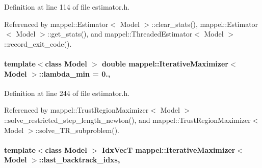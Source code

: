 Definition at line 114 of file estimator.\+h.



Referenced by mappel\+::\+Estimator$<$ Model $>$\+::clear\+\_\+stats(), mappel\+::\+Estimator$<$ Model $>$\+::get\+\_\+stats(), and mappel\+::\+Threaded\+Estimator$<$ Model $>$\+::record\+\_\+exit\+\_\+code().

\paragraph[{\texorpdfstring{lambda\+\_\+min}{lambda_min}}]{\setlength{\rightskip}{0pt plus 5cm}template$<$class Model $>$ double {\bf mappel\+::\+Iterative\+Maximizer}$<$ Model $>$\+::lambda\+\_\+min = 0.\hspace{0.3cm}{\ttfamily [protected]}, {\ttfamily [inherited]}}\hypertarget{classmappel_1_1IterativeMaximizer_a871576ad8b418a1f05df6a9eba2c60ab}{}\label{classmappel_1_1IterativeMaximizer_a871576ad8b418a1f05df6a9eba2c60ab}


Definition at line 244 of file estimator.\+h.



Referenced by mappel\+::\+Trust\+Region\+Maximizer$<$ Model $>$\+::solve\+\_\+restricted\+\_\+step\+\_\+length\+\_\+newton(), and mappel\+::\+Trust\+Region\+Maximizer$<$ Model $>$\+::solve\+\_\+\+T\+R\+\_\+subproblem().

\paragraph[{\texorpdfstring{last\+\_\+backtrack\+\_\+idxs}{last_backtrack_idxs}}]{\setlength{\rightskip}{0pt plus 5cm}template$<$class Model $>$ {\bf Idx\+VecT} {\bf mappel\+::\+Iterative\+Maximizer}$<$ Model $>$\+::last\+\_\+backtrack\+\_\+idxs\hspace{0.3cm}{\ttfamily [protected]}, {\ttfamily [inherited]}}\hypertarget{classmappel_1_1IterativeMaximizer_a80280950668483fccde55616ecc38b7b}{}\label{classmappel_1_1IterativeMaximizer_a80280950668483fccde55616ecc38b7b}


